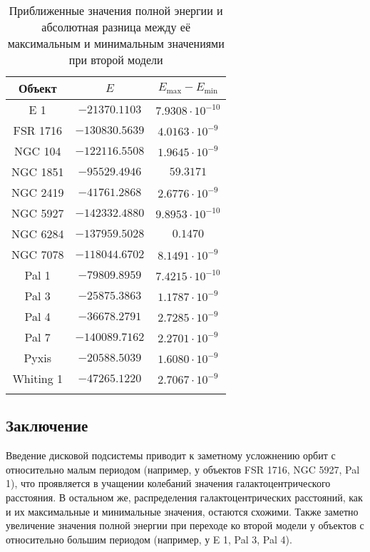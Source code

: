 \documentclass[a4paper, oneside]{article}
\begin{document}
\begin{table}[h]
  \centering
  \caption{Приближенные значения полной энергии и абсолютная разница между её максимальным и минимальным значениями при второй модели}
  \begin{tabular}{ccc}
    \toprule
    Объект &
    $ E $ &
    $ E_\text{max} - E_\text{min} $ \\
    \midrule
    \arrayrulecolor{black!40}
    E 1 & $ -21370.1103 $ & $ 7.9308 \cdot 10^{-10} $ \\
    \midrule
    FSR 1716 & $ -130830.5639 $ & $ 4.0163 \cdot 10^{-9} $ \\
    \midrule
    NGC 104 & $ -122116.5508 $ & $ 1.9645 \cdot 10^{-9} $ \\
    \midrule
    NGC 1851 & $ -95529.4946 $ & $ 59.3171 $ \\
    \midrule
    NGC 2419 & $ -41761.2868 $ & $ 2.6776 \cdot 10^{-9} $ \\
    \midrule
    NGC 5927 & $ -142332.4880 $ & $ 9.8953 \cdot 10^{-10} $ \\
    \midrule
    NGC 6284 & $ -137959.5028 $ & $ 0.1470 $ \\
    \midrule
    NGC 7078 & $ -118044.6702 $ & $ 8.1491 \cdot 10^{-9} $ \\
    \midrule
    Pal 1 & $ -79809.8959 $ & $ 7.4215 \cdot 10^{-10} $ \\
    \midrule
    Pal 3 & $ -25875.3863 $ & $ 1.1787 \cdot 10^{-9} $ \\
    \midrule
    Pal 4 & $ -36678.2791 $ & $ 2.7285 \cdot 10^{-9} $ \\
    \midrule
    Pal 7 & $ -140089.7162 $ & $ 2.2701 \cdot 10^{-9} $ \\
    \midrule
    Pyxis & $ -20588.5039 $ & $ 1.6080 \cdot 10^{-9} $ \\
    \midrule
    Whiting 1 & $ -47265.1220 $ & $ 2.7067 \cdot 10^{-9} $ \\
    \arrayrulecolor{black}
    \bottomrule
  \end{tabular}
\end{table}

\subsection*{Заключение}

Введение дисковой подсистемы приводит к заметному усложнению орбит с относительно малым периодом (например, у объектов FSR 1716, NGC 5927, Pal 1), что проявляется в учащении колебаний значения галактоцентрического расстояния. В остальном же, распределения галактоцентрических расстояний, как и их максимальные и минимальные значения, остаются схожими. Также заметно увеличение значения полной энергии при переходе ко второй модели у объектов с относительно большим периодом (например, у E 1, Pal 3, Pal 4).
\end{document}
